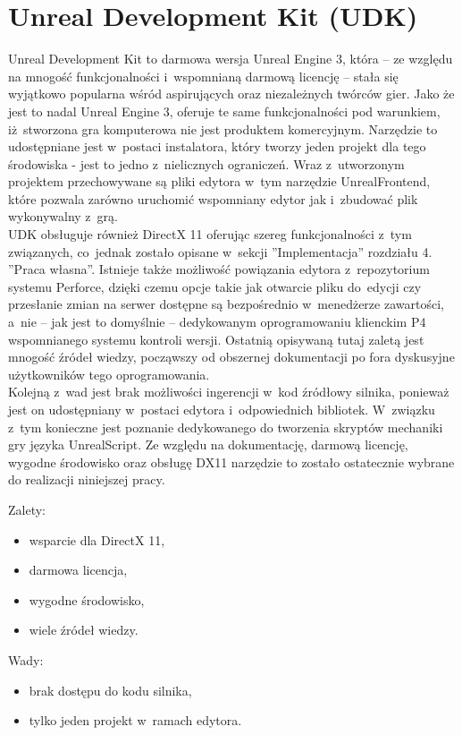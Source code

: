 \section{Unreal Development Kit (UDK)}

Unreal Development Kit to darmowa wersja Unreal Engine 3, która -- ze względu na mnogość funkcjonalności i~wspomnianą darmową licencję -- stała się wyjątkowo popularna wśród aspirujących oraz niezależnych twórców gier. Jako że jest to nadal Unreal Engine 3, oferuje te same funkcjonalności pod warunkiem, iż~stworzona gra komputerowa nie jest produktem komercyjnym. Narzędzie to udostępniane jest w~postaci instalatora, który tworzy jeden projekt dla tego środowiska - jest to jedno z~nielicznych ograniczeń. Wraz z~utworzonym projektem przechowywane są pliki edytora w~tym narzędzie UnrealFrontend, które pozwala zarówno uruchomić wspomniany edytor jak i~zbudować plik wykonywalny z~grą.\\
UDK obsługuje również DirectX 11 oferując szereg funkcjonalności z~tym związanych, co~jednak zostało opisane w~sekcji ''Implementacja'' rozdziału 4. ''Praca własna''. Istnieje także możliwość powiązania edytora z~repozytorium systemu Perforce, dzięki czemu opcje takie jak otwarcie pliku do~edycji czy przesłanie zmian na serwer dostępne są bezpośrednio w~menedżerze zawartości, a~nie -- jak jest to domyślnie -- dedykowanym oprogramowaniu klienckim P4 wspomnianego systemu kontroli wersji. Ostatnią opisywaną tutaj zaletą jest mnogość źródeł wiedzy, począwszy od obszernej dokumentacji po fora dyskusyjne użytkowników tego oprogramowania.\\
Kolejną z~wad jest brak możliwości ingerencji w~kod źródłowy silnika, ponieważ jest on udostępniany w~postaci edytora i~odpowiednich bibliotek. W~związku z~tym konieczne jest poznanie dedykowanego do tworzenia skryptów mechaniki gry języka UnrealScript.
Ze względu na dokumentację, darmową licencję, wygodne środowisko oraz obsługę DX11 narzędzie to zostało ostatecznie wybrane do realizacji niniejszej pracy.\\

{\raggedright Zalety:
\begin{itemize}
\item wsparcie dla DirectX 11,
\item darmowa licencja,
\item wygodne środowisko,
\item wiele źródeł wiedzy.
\end{itemize}

Wady:
\begin{itemize}
\item brak dostępu do kodu silnika,
\item tylko jeden projekt w~ramach edytora.
\end{itemize}
}

